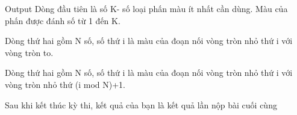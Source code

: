 Output  
Dòng đầu tiên là số K- số loại phấn màu ít nhất cần dùng. Màu của phấn được đánh số từ 1 đến K.  

   Dòng thứ hai gồm N số, số thứ i là màu của đoạn nối vòng tròn nhỏ thứ i với vòng tròn to.  

   Dòng thứ hai gồm N số, số thứ i là màu của đoạn nối vòng tròn nhỏ thứ i với vòng tròn nhỏ thứ (i mod N)+1.  

    Sau khi kết thúc kỳ thi, kết quả của bạn là kết quả lần nộp bài cuối cùng